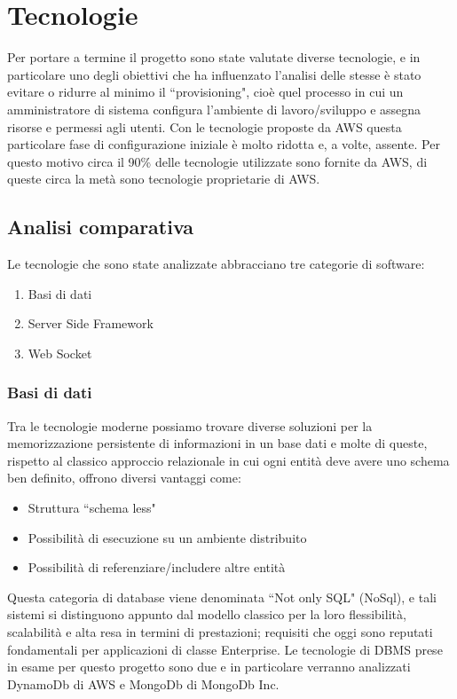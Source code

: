 \chapter{Tecnologie}

Per portare a termine il progetto sono state valutate diverse tecnologie, e in particolare uno degli obiettivi che ha influenzato l'analisi delle stesse è stato evitare o ridurre al minimo il ``provisioning",  cioè quel processo in cui un amministratore di sistema configura l'ambiente di lavoro/sviluppo e assegna risorse e permessi agli utenti. Con le tecnologie proposte da AWS questa particolare fase di configurazione iniziale è molto ridotta e, a volte, assente. Per questo motivo circa il 90\% delle tecnologie utilizzate sono fornite da AWS, di queste circa la metà sono tecnologie proprietarie di AWS.


\section{Analisi comparativa}
Le tecnologie che sono state analizzate abbracciano tre categorie di software:
\begin{enumerate}
	\item Basi di dati
	\item Server Side Framework
	\item Web Socket
\end{enumerate}

\subsection{Basi di dati}
Tra le tecnologie moderne possiamo trovare diverse soluzioni per la memorizzazione persistente di informazioni in un base dati e molte di queste, rispetto al classico approccio relazionale in cui ogni entità deve avere uno schema ben definito, offrono diversi vantaggi come:
\begin{itemize}
	\item Struttura ``schema less"
	\item Possibilità di esecuzione su un ambiente distribuito
	\item Possibilità di referenziare/includere altre entità
\end{itemize}
Questa categoria di database viene denominata ``Not only SQL" (NoSql), e tali sistemi si distinguono appunto dal modello classico per la loro flessibilità, scalabilità e alta resa in termini di prestazioni; requisiti che oggi sono reputati fondamentali per applicazioni di classe Enterprise.
Le tecnologie di DBMS prese in esame per questo progetto sono due e in particolare verranno analizzati DynamoDb di AWS e MongoDb di MongoDb Inc. 
